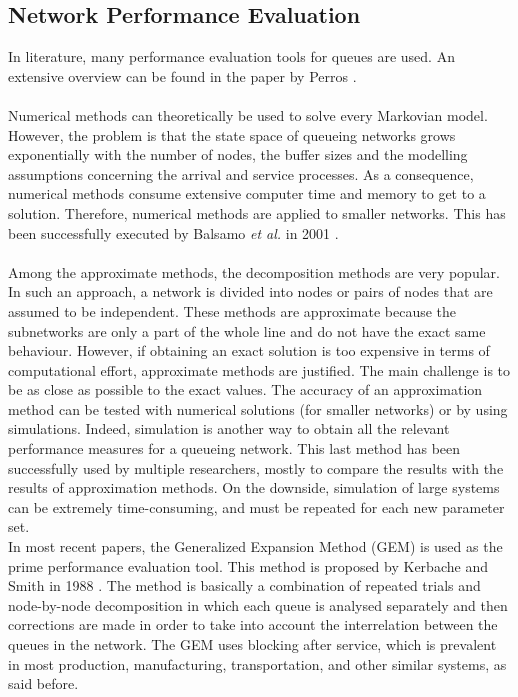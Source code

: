 \documentclass[twoside]{article}
\begin{document}
\begin{multicols}{2}
\subsection{\textbf{Network Performance Evaluation}}
In literature, many performance evaluation tools for queues are used. An extensive overview can be found in the paper by Perros \cite{productform}. \\\\
Numerical methods can theoretically be used to solve every Markovian model. However, the problem is that the state space of queueing networks grows exponentially with the number of nodes, the buffer sizes and the modelling assumptions concerning the arrival and service processes. As a consequence, numerical methods consume extensive computer time and memory to get to a solution. Therefore, numerical methods are applied to smaller networks. This has been successfully executed by Balsamo \textit{et al.} in 2001 \cite{mixed}.\\\\
Among the approximate methods, the decomposition methods are very popular. In such an approach, a network is divided into nodes or pairs of nodes that are assumed to be independent. These methods are approximate because the subnetworks are only a part of the whole line and do not have the exact same behaviour. However, if obtaining an exact solution is too expensive in terms of computational effort, approximate methods are justified. The main challenge is to be as close as possible to the exact values. The accuracy of an approximation method can be tested with numerical solutions (for smaller networks) or by using simulations. Indeed, simulation is another way to obtain all the relevant performance measures for a queueing network. This last method has been successfully used by multiple researchers, mostly to compare the results with the results of approximation methods. On the downside, simulation of large systems can be extremely time-consuming, and must be repeated for each new parameter set.\\
In most recent papers, the Generalized Expansion Method (GEM) is used as the prime performance evaluation tool. This method is proposed by Kerbache and Smith in 1988 \cite{gem}. The method is basically a combination of repeated trials and node-by-node decomposition in which each queue is analysed separately and then corrections are made in order to take into account the interrelation between the queues in the network. The GEM uses blocking after service, which is prevalent in most production, manufacturing, transportation, and other similar systems, as said before.\\

\end{multicols}
\end{document}
